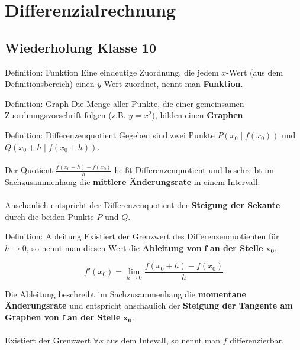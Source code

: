 \documentclass{article}
\begin{document}


\section{Differenzialrechnung}

\subsection{Wiederholung Klasse 10}
\begin{boxx}[Red]{Definition: Funktion}
    Eine eindeutige Zuordnung, die jedem $x$-Wert (aus dem Definitionsbereich) 
    einen $y$-Wert zuordnet, nennt man \textbf{Funktion}.
\end{boxx}

\begin{boxx}[Red]{Definition: Graph}
    Die Menge aller Punkte, die einer gemeinsamen Zuordnungsvorschrift folgen 
    (z.B. $\displaystyle y = x^2$), bilden einen \textbf{Graphen}.
\end{boxx}

\begin{boxx}[Red]{Definition: Differenzenquotient}
    Gegeben sind zwei Punkte $\displaystyle P\left(x_0\;|\;f\left(x_0\right)\right)$ und
    $\displaystyle Q\left(x_0 + h\;|\;f\left(x_0 + h\right)\right)$.
    \\\\
    Der Quotient $\displaystyle \frac{f\left(x_0 + h\right)- f\left(x_0\right)}{h}$
    heißt Differenzenquotient und beschreibt im Sachzusammenhang die 
    \textbf{mittlere Änderungsrate} in einem Intervall.
    \\\\
    Anschaulich entspricht der Differenzenquotient der \textbf{Steigung der Sekante}
    durch die beiden Punkte $P$ und $Q$.
\end{boxx}

\begin{boxx}[Red]{Definition: Ableitung}
    Existiert der Grenzwert des Differenzenquotienten für $h \to 0$, so nennt man
    diesen Wert die \textbf{Ableitung von} $\mathbf{f}$ \textbf{an der Stelle} $\mathbf{x_0}$.

    \[f'\left(x_0\right) = \lim_{h \to 0} \frac{f\left(x_0 + h\right)- f\left(x_0\right)}{h}\]

    Die Ableitung beschreibt im Sachzusammenhang die \textbf{momentane Änderungsrate}
    und entspricht anschaulich der \textbf{Steigung der Tangente am Graphen von} $\mathbf{f}$ 
    \textbf{an der Stelle} $\mathbf{x_0}$. 
    \\\\
    Existiert der Grenzwert $\forall x$ aus dem Intevall, so nennt man $f$ differenzierbar.
\end{boxx}
\end{document}
